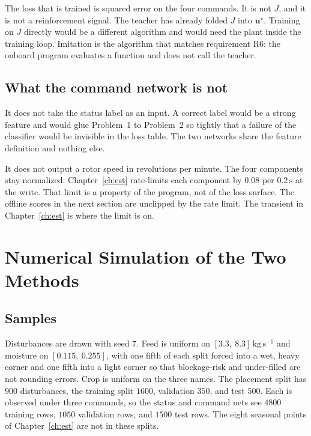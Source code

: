 The loss that is trained is squared error on the four commands. It is not \(J\), and it is not a reinforcement signal. The teacher has already folded \(J\) into \(\mathbf{u}^\star\). Training on \(J\) directly would be a different algorithm and would need the plant inside the training loop. Imitation is the algorithm that matches requirement R6: the onboard program evaluates a function and does not call the teacher.

\subsection{What the command network is not}

It does not take the status label as an input. A correct label would be a strong feature and would glue Problem~1 to Problem~2 so tightly that a failure of the classifier would be invisible in the loss table. The two networks share the feature definition and nothing else.

It does not output a rotor speed in revolutions per minute. The four components stay normalized. Chapter~\ref{ch:est} rate-limits each component by \(0.08\) per \(0.2\,\mathrm{s}\) at the write. That limit is a property of the program, not of the loss surface. The offline scores in the next section are unclipped by the rate limit. The transient in Chapter~\ref{ch:est} is where the limit is on.

\section{Numerical Simulation of the Two Methods}
\label{sec:simoff}

\subsection{Samples}

Disturbances are drawn with seed \(7\). Feed is uniform on \([3.3,\ 8.3]\,\mathrm{kg\,s^{-1}}\) and moisture on \([0.115,\ 0.255]\), with one fifth of each split forced into a wet, heavy corner and one fifth into a light corner so that blockage-risk and under-filled are not rounding errors. Crop is uniform on the three names. The placement split has \(900\) disturbances, the training split \(1600\), validation \(350\), and test \(500\). Each is observed under three commands, so the status and command nets see \(4800\) training rows, \(1050\) validation rows, and \(1500\) test rows. The eight seasonal points of Chapter~\ref{ch:est} are not in these splits.

